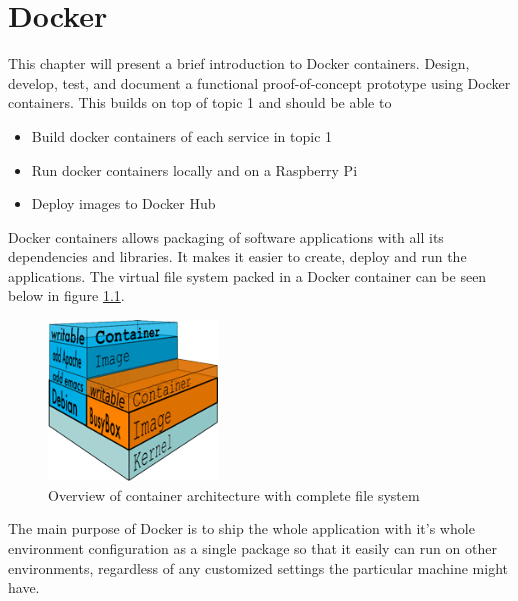 \chapter{Docker}\label{ch:docker}
This chapter will present a brief introduction to Docker containers.  Design, develop, test, and document a functional proof-of-concept prototype using Docker containers. This builds on top of topic 1 and should be able to

\begin{itemize}
\item Build docker containers of each service in topic 1
\item Run docker containers locally and on a Raspberry Pi
\item Deploy images to Docker Hub
\end{itemize}


Docker containers allows packaging of software applications with all its dependencies and libraries. It makes it easier to create, deploy and run the applications. The virtual file system  packed in a Docker container can be seen below in figure \ref{fig:filesystem}.

\begin{figure}[bth]
  \centering

      \includegraphics[width=0.4\textwidth]{gfx/what_is_layered_filesystems_sm}
  \caption{Overview of container architecture with complete file system }
  \label{fig:filesystem}
  
\end{figure}


The main purpose of Docker is to ship the whole application with it's whole environment configuration as a single package so that it easily can run on other environments, regardless of any customized settings the particular machine might have.


